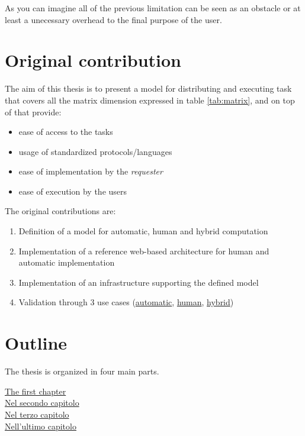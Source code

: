 As you can imagine all of the previous limitation can be seen as an obstacle or at least a
unecessary overhead to the final purpose of the user.










\section*{Original contribution}
The aim of this thesis is to present a model for distributing and executing task that covers all
the matrix dimension expressed in table \ref{tab:matrix}, and on top of that provide:
\begin{itemize}
	\item ease of access to the tasks
	\item usage of standardized protocols/languages
	\item ease of implementation by the \emph{requester}
	\item ease of execution by the users
\end{itemize}

The original contributions are:
\begin{enumerate}
	\item Definition of a model for automatic, human and hybrid computation
	\item Implementation of a reference web-based architecture for human and automatic implementation
	\item Implementation of an infrastructure supporting the defined model
	\item Validation through 3 use cases (\hyperref[sec:cases:automatic]{automatic},
	\hyperref[sec:cases:human]{human}, \hyperref[sec:cases:hybrid]{hybrid})
\end{enumerate}







\section*{Outline}
The thesis is organized in four main parts.

\begin{description}
	\item[{\hyperref[cap:bg]{The first chapter}}]

	\item[{\hyperref[cap:model]{Nel secondo capitolo}}]

	\item[{\hyperref[cap:cases]{Nel terzo capitolo}}]

	\item[{\hyperref[cap:implementation]{Nell'ultimo capitolo}}]
\end{description}